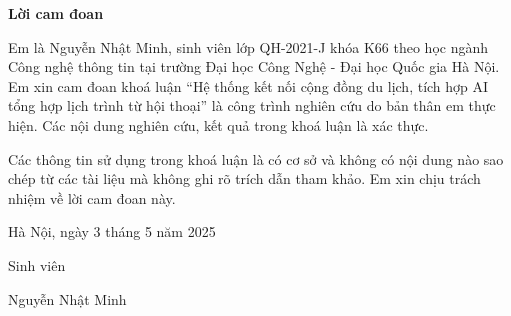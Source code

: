 \setcounter{page}{1}
\begin{center}
\textbf{\large{Lời cam đoan}	}
\end{center}
Em là Nguyễn Nhật Minh, sinh viên lớp QH-2021-J khóa K66 theo học ngành Công nghệ thông tin tại trường Đại học Công Nghệ - Đại học Quốc gia Hà Nội. Em xin cam đoan khoá luận ``Hệ thống kết nối cộng đồng du lịch, tích hợp AI tổng hợp lịch trình từ hội thoại'' là công trình nghiên cứu do bản thân em thực hiện. Các nội dung nghiên cứu, kết quả trong khoá luận là xác thực.

Các thông tin sử dụng trong khoá luận là có cơ sở và không có nội dung nào sao chép từ các tài liệu mà không ghi rõ trích dẫn tham khảo. Em xin chịu trách nhiệm về lời cam đoan này.

\begin{flushright}
Hà Nội, ngày 3 tháng 5 năm 2025
\end{flushright}

\begin{changemargin}{12cm}{2cm}
Sinh viên
\\[2cm]
\end{changemargin}

\begin{changemargin}{11cm}{1cm}
Nguyễn Nhật Minh
\end{changemargin}